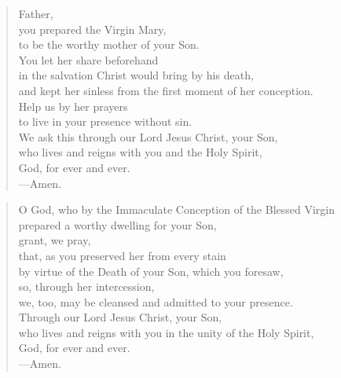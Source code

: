 \prayer

\setlength{\vleftmargin}{\prayerleftmargini}

\begin{verse}
Father,\\
you prepared the Virgin Mary,\\
to be the worthy mother of your Son.\\
You let her share beforehand\\
in the salvation Christ would bring by his death,\\
and kept her sinless from the first moment of her conception.\\
Help us by her prayers\\
to live in your presence without sin.\\
We ask this through our Lord Jesus Christ, your Son,\\
who lives and reigns with you and the Holy Spirit,\\
God, for ever and ever.\\
{\color{red}---\thinspace}Amen.
\end{verse}


\begin{verse}
O God, who by the Immaculate Conception of the Blessed Virgin\\
prepared a worthy dwelling for your Son,\\
grant, we pray,\\
that, as you preserved her from every stain\\
by virtue of the Death of your Son, which you foresaw,\\
so, through her intercession,\\
we, too, may be cleansed and admitted to your presence.\\
Through our Lord Jesus Christ, your Son,\\
who lives and reigns with you in the unity of the Holy Spirit,\\
God, for ever and ever.\\
{\color{red}---\thinspace}Amen.
\end{verse}

\setlength{\vleftmargin}{\defleftmargini}